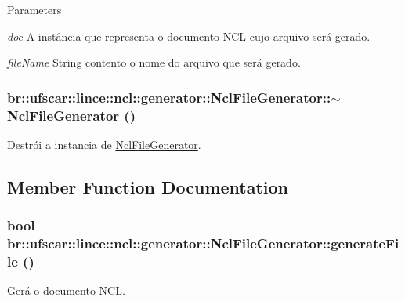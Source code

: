 \begin{DoxyParams}{Parameters}
\item[{\em doc}]A instância que representa o documento NCL cujo arquivo será gerado. \item[{\em fileName}]String contento o nome do arquivo que será gerado. \end{DoxyParams}
\hypertarget{classbr_1_1ufscar_1_1lince_1_1ncl_1_1generator_1_1NclFileGenerator_a425e6d02060ed52727362a3fb26b0155}{
\subsubsection[{$\sim$NclFileGenerator}]{\setlength{\rightskip}{0pt plus 5cm}br::ufscar::lince::ncl::generator::NclFileGenerator::$\sim$NclFileGenerator ()}}
\label{classbr_1_1ufscar_1_1lince_1_1ncl_1_1generator_1_1NclFileGenerator_a425e6d02060ed52727362a3fb26b0155}


Destrói a instancia de \hyperlink{classbr_1_1ufscar_1_1lince_1_1ncl_1_1generator_1_1NclFileGenerator}{NclFileGenerator}. 



\subsection{Member Function Documentation}
\hypertarget{classbr_1_1ufscar_1_1lince_1_1ncl_1_1generator_1_1NclFileGenerator_ad7cab5c73d2f56107f0152d37edc8ac6}{
\subsubsection[{generateFile}]{\setlength{\rightskip}{0pt plus 5cm}bool br::ufscar::lince::ncl::generator::NclFileGenerator::generateFile ()}}
\label{classbr_1_1ufscar_1_1lince_1_1ncl_1_1generator_1_1NclFileGenerator_ad7cab5c73d2f56107f0152d37edc8ac6}


Gerá o documento NCL. 

